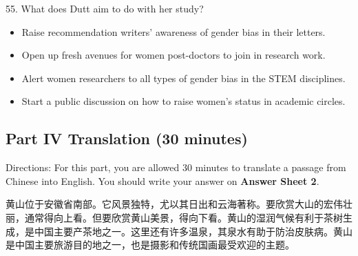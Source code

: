 \documentclass[UTF8,11pt]{ctexart}
\begin{document}
55. What does Dutt aim to do with her study?


\begin{itemize}[leftmargin=2em,itemsep=.2em,topsep=.4em]\item[A.] Raise recommendation writers’ awareness of gender bias in their letters.
\item[B.] Open up fresh avenues for women post-doctors to join in research work.
\item[C.] Alert women researchers to all types of gender bias in the STEM disciplines.
\item[D.] Start a public discussion on how to raise women’s status in academic circles.
\end{itemize}

\subsection*{\textbf{Part} IV \textbf{Translation} \textbf{(30 minutes)}}


Directions: For this part, you are allowed 30 minutes to translate a passage from Chinese into English. You should write your answer on\textbf{ Answer Sheet 2}.


黄山位于安徽省南部。它风景独特，尤以其日出和云海著称。要欣赏大山的宏伟壮丽，通常得向上看。但要欣赏黄山美景，得向下看。黄山的湿润气候有利于茶树生成，是中国主要产茶地之一。这里还有许多温泉，其泉水有助于防治皮肤病。黄山是中国主要旅游目的地之一，也是摄影和传统国画最受欢迎的主题。
\end{document}
